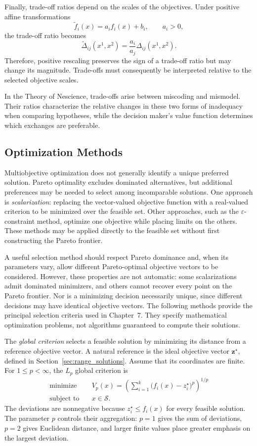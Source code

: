 Finally, trade-off ratios depend on the scales of the objectives. Under positive affine transformations
\[
\widetilde f_i(x)=a_i f_i(x)+b_i,
\qquad a_i>0,
\]
the trade-off ratio becomes
\[
\widetilde\Delta_{ij}(x^1,x^2)
=\frac{a_i}{a_j}\Delta_{ij}(x^1,x^2).
\]
Therefore, positive rescaling preserves the sign of a trade-off ratio but may change its magnitude. Trade-offs must consequently be interpreted relative to the selected objective scales.

In the Theory of Nescience, trade-offs arise between miscoding and mismodel. Their ratios characterize the relative changes in these two forms of inadequacy when comparing hypotheses, while the decision maker's value function determines which exchanges are preferable.


\subsection*{Optimization Methods}
\label{sec:pareto_optimization_methods}

Multiobjective optimization does not generally identify a unique preferred solution. Pareto optimality excludes dominated alternatives, but additional preferences may be needed to select among incomparable solutions. One approach is \emph{scalarization}: replacing the vector-valued objective function with a real-valued criterion to be minimized over the feasible set. Other approaches, such as the $\varepsilon$-constraint method, optimize one objective while placing limits on the others. These methods may be applied directly to the feasible set without first constructing the Pareto frontier.

A useful selection method should respect Pareto dominance and, when its parameters vary, allow different Pareto-optimal objective vectors to be considered. However, these properties are not automatic: some scalarizations admit dominated minimizers, and others cannot recover every point on the Pareto frontier. Nor is a minimizing decision necessarily unique, since different decisions may have identical objective vectors. The following methods provide the principal selection criteria used in Chapter~7. They specify mathematical optimization problems, not algorithms guaranteed to compute their solutions.

The \emph{global criterion} selects a feasible solution by minimizing its distance from a reference objective vector. A natural reference is the ideal objective vector $\mathbf{z}^{\star}$, defined in Section~\ref{sec:range_solutions}. Assume that its coordinates are finite. For $1\leq p<\infty$, the $L_p$ global criterion is
\[
\begin{aligned}
\text{minimize}\quad & V_p(x)=
\left(\sum_{i=1}^{k}\bigl(f_i(x)-z_i^{\star}\bigr)^p\right)^{1/p}\\
\text{subject to}\quad & x\in\mathcal{S}.
\end{aligned}
\]
The deviations are nonnegative because $z_i^{\star}\leq f_i(x)$ for every feasible solution. The parameter $p$ controls their aggregation: $p=1$ gives the sum of deviations, $p=2$ gives Euclidean distance, and larger finite values place greater emphasis on the largest deviation.

